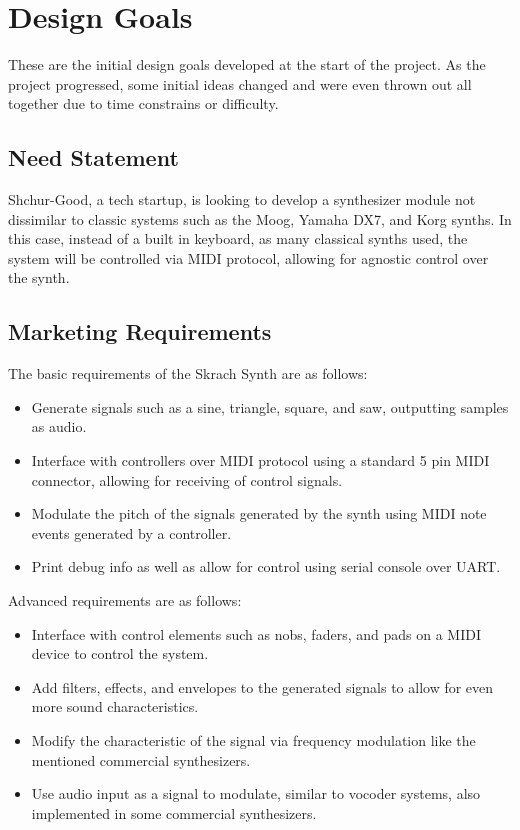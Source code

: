 \documentclass[12pt]{article}
\begin{document}
\section{Design Goals}

These are the initial design goals developed at the start of the project. As the project progressed, some initial ideas changed and were even thrown out all together due to time constrains or difficulty.

\subsection{Need Statement}

Shchur-Good, a tech startup, is looking to develop a synthesizer module not dissimilar to classic systems such as the Moog, Yamaha DX7, and Korg synths. In this case, instead of a built in keyboard, as many classical synths used, the system will be controlled via MIDI protocol, allowing for agnostic control over the synth.

\subsection{Marketing Requirements}

The basic requirements of the Skrach Synth are as follows:

\begin{itemize}
    \item Generate signals such as a sine, triangle, square, and saw, outputting samples as audio.
    \item Interface with controllers over MIDI protocol using a standard 5 pin MIDI connector, allowing for receiving of control signals.
    \item Modulate the pitch of the signals generated by the synth using MIDI note events generated by a controller.
    \item Print debug info as well as allow for control using serial console over UART.
\end{itemize}

\noindent Advanced requirements are as follows:

\begin{itemize}
    \item Interface with control elements such as nobs, faders, and pads on a MIDI device to control the system.
    \item Add filters, effects, and envelopes to the generated signals to allow for even more sound characteristics.
    \item Modify the characteristic of the signal via frequency modulation like the mentioned commercial synthesizers.
    \item Use audio input as a signal to modulate, similar to vocoder systems, also implemented in some commercial synthesizers.
\end{itemize}
\end{document}
